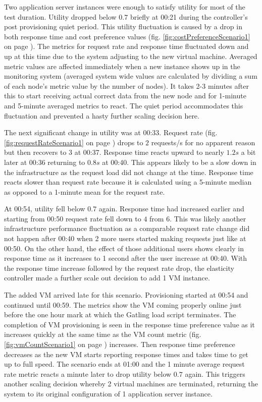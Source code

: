 \documentclass[english]{tktltiki2}
\theoremstyle{definition}
\theoremstyle{remark}
\begin{document}
Two application server instances were enough to satisfy utility for most of the
test duration. Utility dropped below $0.7$ briefly at 00:21 during the
controller's post provisioning quiet period. This utility fluctuation is caused
by a drop in both response time and cost preference values (fig.
\ref{fig:costPreferenceScenario1} on page
\pageref{fig:costPreferenceScenario1}). The metrics for request rate and
response time fluctuated down and up at this time due to the system adjusting to
the new virtual machine. Averaged metric values are affected immediately when a
new instance shows up in the monitoring system (averaged system wide values are
calculated by dividing a sum of each node's metric value by the number of
nodes). It takes 2-3 minutes after this to start receiving actual correct data
from the new node and for 1-minute and 5-minute averaged metrics to react. The
quiet period accommodates this fluctuation and prevented a hasty further scaling
decision here.

The next significant change in utility was at 00:33. Request rate (fig.
\ref{fig:requestRateScenario1} on page \pageref{fig:requestRateScenario1}) drops
to $2$ requests/s for no apparent reason but then recovers to $3$ at 00:37.
Response time reacts upward to nearly $1.2 s$ a bit later at 00:36 returning to
$0.8 s$ at 00:40. This appears likely to be a slow down in the infrastructure as
the request load did not change at the time. Response time reacts slower than
request rate because it is calculated using a 5-minute median as opposed to a
1-minute mean for the request rate.

At 00:54, utility fell below $0.7$ again. Response time had increased earlier
and starting from 00:50 request rate fell down to $4$ from $6$. This was likely
another infrastructure performance fluctuation as a comparable request rate
change did not happen after 00:40 when 2 more users started making requests
just like at 00:50. On the other hand, the effect of those additional users shows
clearly in response time as it increases to 1 second after the user increase at
00:40. With the response time increase followed by the request rate drop, the
elasticity controller made a further scale out decision to add 1 VM instance.

The added VM arrived late for this scenario. Provisioning started at 00:54 and
continued until 00:59. The metrics show the VM coming properly online just
before the one hour mark at which the Gatling load script terminates. The
completion of VM provisioning is seen in the response time preference value as
it increases quickly at the same time as the VM count metric (fig.
\ref{fig:vmCountScenario1} on page \pageref{fig:vmCountScenario1}) increases.
Then response time preference decreases as the new VM starts reporting response
times and takes time to get up to full speed. The scenario ends at 01:00 and the
1 minute average request rate metric reacts a minute later to drop utility below
$0.7$ again. This triggers another scaling decision whereby 2 virtual machines
are terminated, returning the system to its original configuration of 1
application server instance.
\end{document}
